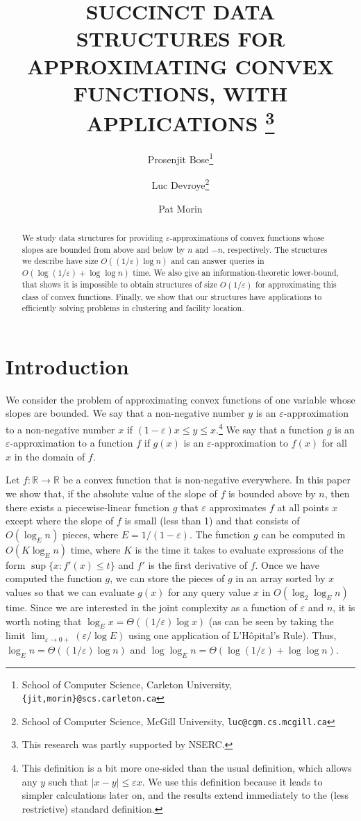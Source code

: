 \documentclass[charterfonts,lotsofwhite]{patmorin}
\title{\MakeUppercase{Succinct Data Structures for Approximating
Convex Functions, with Applications}%
     \thanks{This research was partly supported by NSERC.}}
\author{Prosenjit Bose\thanks{School of Computer Science, Carleton
	University, \texttt{\{jit,morin\}@scs.carleton.ca}} \and
  Luc Devroye\thanks{School of Computer Science, McGill University,
  	\texttt{luc@cgm.cs.mcgill.ca}} \and 
  Pat Morin\footnotemark[3]}
\date{}
\newcommand{\eps}{\varepsilon}
\newcommand{\Real}{\mathbb{R}}
\begin{document}
\maketitle

\begin{abstract} 
We study data structures for providing $\eps$-approximations of convex
functions whose slopes are bounded from above and below by $n$ and
$-n$, respectively. The structures we describe have size
$O((1/\eps)\log n)$ and can answer queries in $O(\log(1/\eps)+\log\log
n)$ time.  We also give an information-theoretic lower-bound, that
shows it is impossible to obtain structures of size $O(1/\eps)$ for
approximating this class of convex functions.  Finally, we show that
our structures have applications to efficiently solving problems in
clustering and facility location.  
\end{abstract}

\section{Introduction}

We consider the problem of approximating convex functions of one
variable whose slopes are bounded.  We say that a non-negative number
$y$ is an $\eps$-approximation to a non-negative number $x$ if
$(1-\eps)x\le y \le x$.\footnote{This definition is a bit more
one-sided than the usual definition, which allows any $y$ such that
$|x-y|\le \eps x$.  We use this definition because it leads to simpler
calculations later on, and the results extend immediately to the (less
restrictive) standard definition.}  We say that a function $g$ is an
$\eps$-approximation to a function $f$ if $g(x)$ is an
$\eps$-approximation to $f(x)$ for all $x$ in the domain of $f$.

Let $f:\Real\rightarrow \Real$ be a convex function that is
non-negative everywhere.  In this paper we show that, if the absolute
value of the slope of $f$ is bounded above by $n$, then there exists a
piecewise-linear function $g$ that $\eps$ approximates $f$ at all
points $x$ except where the slope of $f$ is small (less than 1) and
that consists of $O(\log_E n)$ pieces, where $E=1/(1-\eps)$.  The
function $g$ can be computed in $O(K\log_E n)$ time, where $K$ is the
time it takes to evaluate expressions of the form $\sup\{x: f'(x)\le
t\}$ and $f'$ is the first derivative of $f$.  Once we have computed
the function $g$, we can store the pieces of $g$ in an array sorted by
$x$ values so that we can evaluate $g(x)$ for any query value $x$ in
$O(\log_2\log_E n)$ time.  Since we are interested in the joint
complexity as a function of $\eps$ and $n$, it is worth
noting that $\log_E x = \Theta ( (1/\eps) \log x)$ (as can be seen by
taking the limit $\lim_{\eps\rightarrow 0+}(\eps/\log E)$
using one application of L'H\^opital's Rule). Thus, $\log_E
n=\Theta((1/\eps)\log n)$ and $\log\log_E n = \Theta (\log (1/\eps) +
\log \log n)$.
\end{document}
